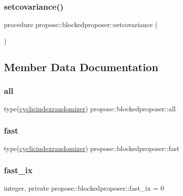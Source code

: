 \subsubsection{\texorpdfstring{setcovariance()}{setcovariance()}}
{\footnotesize\ttfamily procedure propose\+::blockedproposer\+::setcovariance (\begin{DoxyParamCaption}{ }\end{DoxyParamCaption})}



\subsection{Member Data Documentation}
\mbox{\label{structpropose_1_1blockedproposer_a52c508ece4395744d13f023471109156}} 
\subsubsection{\texorpdfstring{all}{all}}
{\footnotesize\ttfamily type(\mbox{\hyperlink{structpropose_1_1cyclicindexrandomizer}{cyclicindexrandomizer}}) propose\+::blockedproposer\+::all}

\mbox{\label{structpropose_1_1blockedproposer_a1af5a32aedbd457ab3f0f645dad6ce39}} 
\subsubsection{\texorpdfstring{fast}{fast}}
{\footnotesize\ttfamily type(\mbox{\hyperlink{structpropose_1_1cyclicindexrandomizer}{cyclicindexrandomizer}}) propose\+::blockedproposer\+::fast}

\mbox{\label{structpropose_1_1blockedproposer_ad026c4ad761ad38804788798286dc950}} 
\subsubsection{\texorpdfstring{fast\+\_\+ix}{fast\_ix}}
{\footnotesize\ttfamily integer, private propose\+::blockedproposer\+::fast\+\_\+ix = 0\hspace{0.3cm}{\ttfamily [private]}}

